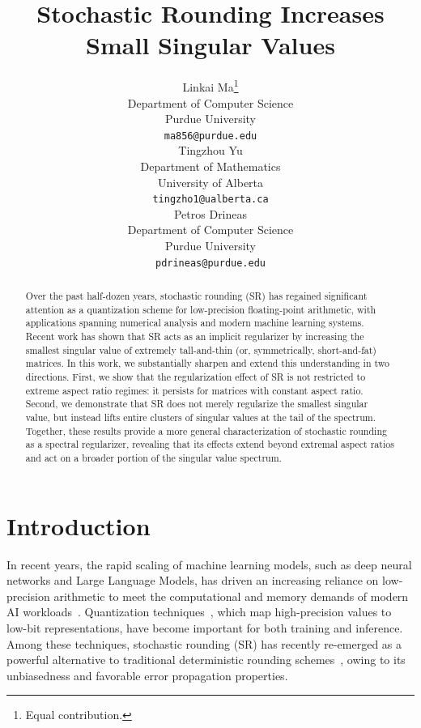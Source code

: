 \documentclass{article}
\title{Stochastic Rounding Increases Small Singular Values}
\author{%
  Linkai Ma\thanks{Equal contribution.} \\
  Department of Computer Science\\
  Purdue University\\
  \texttt{ma856@purdue.edu} \\
  \And
  Tingzhou Yu \footnotemark[1] \\
  Department of Mathematics \\
  University of Alberta \\
  \texttt{tingzho1@ualberta.ca} \\
  \AND
  Petros Drineas \\
  Department of Computer Science \\
  Purdue University \\
  \texttt{pdrineas@purdue.edu} \\
}
\begin{document}
\maketitle

\begin{abstract}
Over the past half-dozen years, stochastic rounding (SR) has regained significant attention as a quantization scheme for low-precision floating-point arithmetic, with applications spanning numerical analysis and modern machine learning systems. Recent work has shown that SR acts as an implicit regularizer by increasing the smallest singular value of extremely tall-and-thin (or, symmetrically, short-and-fat) matrices. In this work, we substantially sharpen and extend this understanding in two directions. First, we show that the regularization effect of SR is not restricted to extreme aspect ratio regimes: it persists for matrices with constant aspect ratio. Second, we demonstrate that SR does not merely regularize the smallest singular value, but instead lifts entire clusters of singular values at the tail of the spectrum. Together, these results provide a more general characterization of stochastic rounding as a spectral regularizer, revealing that its effects extend beyond extremal aspect ratios and act on a broader portion of the singular value spectrum.
\end{abstract}

\section{Introduction}

In recent years, the rapid scaling of machine learning models, such as deep neural networks and Large Language Models, has driven an increasing reliance on low-precision arithmetic to meet the computational and memory demands of modern AI workloads~\citep{micikevicius2018mixed,dettmers2022gpt3}. Quantization techniques~\citep{gholami2022survey,jin2024comprehensive,gupta2025effective}, which map high-precision values to low-bit representations, have become important for both training and inference. Among these techniques, stochastic rounding (SR) has recently re-emerged as a powerful alternative to traditional deterministic rounding schemes~\citep{gupta2015deep,xia2024stochastic,ozkara2025stochastic}, owing to its unbiasedness and favorable error propagation properties.
\end{document}
